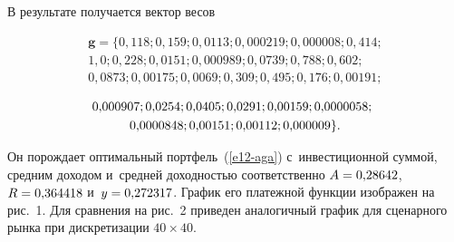 \begin{multicols}{2}
\begin{figure*} %
\vspace*{1pt}
\begin{minipage}[t]{80mm}
\begin{center}
   \mbox{%
\epsfxsize=77.328mm
}
\end{center}
\vspace*{-9pt}
\end{minipage}
\hfill
\vspace*{1pt}
\begin{minipage}[t]{80mm}
\begin{center}
   \mbox{%
\epsfxsize=77.328mm
}
\end{center}
\vspace*{-9pt}
\end{minipage}
\end{figure*}

  
  В результате  получается вектор весов 
  
  \vspace*{-4pt}
  
  \noindent
 \begin{multline*}
  \bm{g}=\{0{,}118; 0{,}159; 0{,}0113; 0{,}000219; 0{,}000008; 0{,}414;\\
   1{,}0; 0{,}228; 0{,}0151; 0{,}000989; 0{,}0739; 0{,}788; 0{,}602;\\
      0{,}0873; 0{,}00175; 0{,}0069; 0{,}309; 0{,}495; 0{,}176; 0{,}00191;
\end{multline*}



\noindent
 \begin{multline*}
   \hspace*{-4.8848pt}0{,}000907; 0{,}0254; 0{,}0405; 0{,}0291; 0{,}00159; 0{,}0000058;\\
   0{,}0000848; 0{,}00151; 0{,}00112;  0{,}000009\}. 
  \end{multline*}
  
  \vspace*{-2pt}

  
  Он порождает оптимальный портфель~(\ref{e12-aga}) с~инвестиционной 
суммой, средним доходом и~средней доходностью соответственно 
  $A\hm=0{,}28642$,  $R\hm=0{,}364418$  и~$y\hm=0{,}272317$. 
      График его платежной функции изображен на рис.~1. Для сравнения на 
рис.~2 приведен аналогичный график для сценарного рынка при дискретизации 
$40\times40$.
  


\end{multicols}
